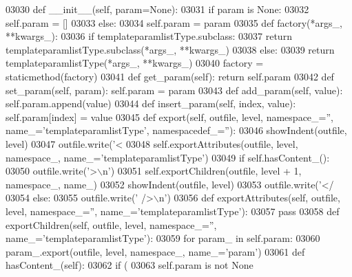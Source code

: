 \begin{DoxyCode}
{{{{{{{{{{{{{{{{{{{{{{{{{{{{{{{{{{{{{{{{{{{{{{{{{{{{{{{{{{{{{{{{{{{{{{{{{{{{{{{{{{{{{{{{{{{{{{{{{{{{{{{{{{{{{{{{{{{{{{{{{{{{{{{{{{{{{{{{{{{{{{{{{{{{{{{{{{{{{{{{{{{{{{{{{{{{{{{{{{{{{{{{{{{{{{{{{{{{{{{{{{{03030     \textcolor{keyword}{def }__init__(self, param=None):
03031         \textcolor{keywordflow}{if} param \textcolor{keywordflow}{is} \textcolor{keywordtype}{None}:
03032             self.param = []
03033         \textcolor{keywordflow}{else}:
03034             self.param = param
03035     \textcolor{keyword}{def }factory(*args\_, **kwargs\_):
03036         \textcolor{keywordflow}{if} templateparamlistType.subclass:
03037             \textcolor{keywordflow}{return} templateparamlistType.subclass(*args\_, **kwargs\_)
03038         \textcolor{keywordflow}{else}:
03039             \textcolor{keywordflow}{return} templateparamlistType(*args\_, **kwargs\_)
03040     factory = staticmethod(factory)
03041     \textcolor{keyword}{def }get_param(self): \textcolor{keywordflow}{return} self.param
03042     \textcolor{keyword}{def }set_param(self, param): self.param = param
03043     \textcolor{keyword}{def }add_param(self, value): self.param.append(value)
03044     \textcolor{keyword}{def }insert_param(self, index, value): self.param[index] = value
03045     \textcolor{keyword}{def }export(self, outfile, level, namespace\_='', name\_='templateparamlistType', namespacedef\_=''):
03046         showIndent(outfile, level)
03047         outfile.write(\textcolor{stringliteral}{'<%
03048         self.exportAttributes(outfile, level, namespace\_, name\_=\textcolor{stringliteral}{'templateparamlistType'})
03049         \textcolor{keywordflow}{if} self.hasContent_():
03050             outfile.write(\textcolor{stringliteral}{'>\(\backslash\)n'})
03051             self.exportChildren(outfile, level + 1, namespace\_, name\_)
03052             showIndent(outfile, level)
03053             outfile.write(\textcolor{stringliteral}{'</%
03054         \textcolor{keywordflow}{else}:
03055             outfile.write(\textcolor{stringliteral}{' />\(\backslash\)n'})
03056     \textcolor{keyword}{def }exportAttributes(self, outfile, level, namespace\_='', name\_='templateparamlistType'):
03057         \textcolor{keywordflow}{pass}
03058     \textcolor{keyword}{def }exportChildren(self, outfile, level, namespace\_='', name\_='templateparamlistType'):
03059         \textcolor{keywordflow}{for} param\_ \textcolor{keywordflow}{in} self.param:
03060             param\_.export(outfile, level, namespace\_, name\_=\textcolor{stringliteral}{'param'})
03061     \textcolor{keyword}{def }hasContent_(self):
03062         \textcolor{keywordflow}{if} (
03063             self.param \textcolor{keywordflow}{is} \textcolor{keywordflow}{not} \textcolor{keywordtype}{None}
}}}}}}}}}}}}}}}}}}}}}}}}}}}}}}}}}}}}}}}}}}}}}}}}}}}}}}}}}}}}}}}}}}}}}}}}}}}}}}}}}}}}}}}}}}}}}}}}}}}}}}}}}}}}}}}}}}}}}}}}}}}}}}}}}}}}}}}}}}}}}}}}}}}}}}}}}}}}}}}}}}}}}}}}}}}}}}}}}}}}}}}}}}}}}}}}}}}}}}}}}}}}}
\end{DoxyCode}
